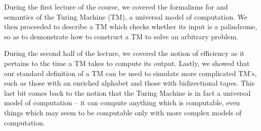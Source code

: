 \documentclass[usletter]{article}
\begin{document}

During the first lecture of the course, we covered the formalisms for and semantics of the Turing Machine (TM), a universal model of computation. We then proceeded to describe a TM which checks whether its input is a palindrome, so as to demonstrate how to construct a TM to solve an arbitrary problem.

During the second half of the lecture, we covered the notion of efficiency as it pertains to the time a TM takes to compute its output. Lastly, we showed that our standard definition of a TM can be used to simulate more complicated TM's, such as those with an enriched alphabet and those with bidirectional tapes. This last bit comes back to the notion that the Turing Machine is in fact a universal model of computation -- it can compute anything which is computable, even things which may seem to be computable only with more complex models of computation.
\end{document}
